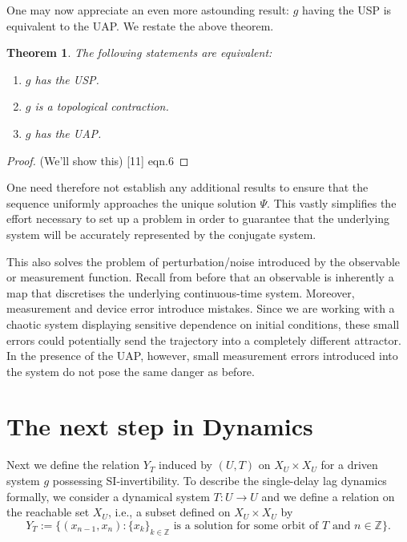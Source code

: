 \documentclass[a4paper,12pt,twoside]{book}
\newtheorem{Theorem}{Theorem}[]
\begin{document}
One may now appreciate an even more astounding result: $g$ having the USP is equivalent to the UAP. We restate the above theorem.

\begin{Theorem}
  The following statements are equivalent:
  \vspace{-8mm}
  \begin{enumerate}[noitemsep, label=\roman*.]
    \item $g$ has the USP.
    \item $g$ is a topological contraction.
    \item $g$ has the UAP.
  \end{enumerate}
\end{Theorem}
\begin{proof}
  (We'll show this)  [11] eqn.6 
\end{proof}

One need therefore not establish any additional results to ensure that the sequence uniformly approaches the unique solution $\Psi$. This vastly simplifies the effort necessary to set up a problem in order to guarantee that the underlying system will be accurately represented by the conjugate system.

This also solves the problem of perturbation/noise introduced by the observable or measurement function. Recall from before that an observable is inherently a map that discretises the underlying continuous-time system. Moreover, measurement and device error introduce mistakes. Since we are working with a chaotic system displaying sensitive dependence on initial conditions, these small errors could potentially send the trajectory into a completely different attractor. In the presence of the UAP, however, small measurement errors introduced into the system do not pose the same danger as before.

\section{The next step in Dynamics}

Next we define the relation $Y_T$ induced by $(U,T)$ on $X_U\times{X_U}$ for a driven system $g$ possessing SI-invertibility.  To describe the  single-delay lag dynamics formally, we consider a dynamical system $T: U \to U$ and we define a relation on the reachable set $X_U$, i.e., a subset defined on $X_U \times X_U$ by 
$$Y_T:=\{(x_{n-1},x_n): \{x_k\}_{k\in \mathbb{Z}} \mbox{ is a solution for some orbit of } T \mbox{ and } n \in \mathbb{Z}\}.$$ 
\end{document}
